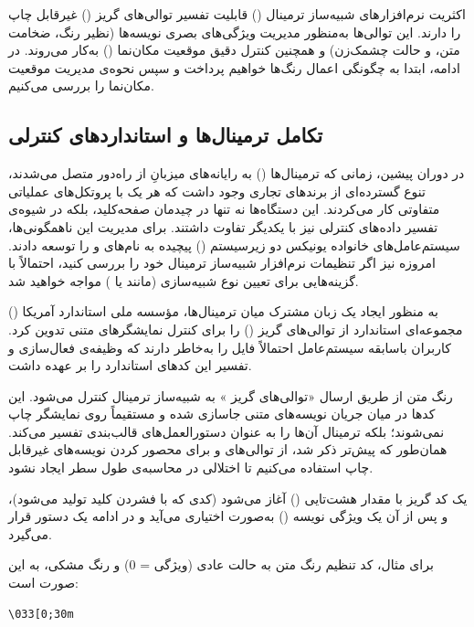 اکثریت نرم‌افزارهای شبیه‌ساز ترمینال () قابلیت تفسیر توالی‌های گریز () غیرقابل چاپ را دارند. این توالی‌ها به‌منظور مدیریت ویژگی‌های بصری نویسه‌ها (نظیر رنگ، ضخامت متن، و حالت چشمک‌زن) و همچنین کنترل دقیق موقعیت مکان‌نما () به‌کار می‌روند. در ادامه، ابتدا به چگونگی اعمال رنگ‌ها خواهیم پرداخت و سپس نحوه‌ی مدیریت موقعیت مکان‌نما را بررسی می‌کنیم.

\subsection{تکامل ترمینال‌ها و استانداردهای کنترلی}

در دوران پیشین، زمانی که ترمینال‌ها () به رایانه‌های میزبانِ از راه‌دور متصل می‌شدند، تنوع گسترده‌ای از برندهای تجاری وجود داشت که هر یک با پروتکل‌های عملیاتی متفاوتی کار می‌کردند. این دستگاه‌ها نه تنها در چیدمان صفحه‌کلید، بلکه در شیوه‌ی تفسیر داده‌های کنترلی نیز با یکدیگر تفاوت داشتند. برای مدیریت این ناهمگونی‌ها، سیستم‌عامل‌های خانواده یونیکس دو زیرسیستم () پیچیده به نام‌های  و  را توسعه دادند. امروزه نیز اگر تنظیمات نرم‌افزار شبیه‌ساز ترمینال خود را بررسی کنید، احتمالاً با گزینه‌هایی برای تعیین نوع شبیه‌سازی (مانند  یا ) مواجه خواهید شد.

به منظور ایجاد یک زبان مشترک میان ترمینال‌ها، مؤسسه ملی استاندارد آمریکا () مجموعه‌ای استاندارد از توالی‌های گریز () را برای کنترل نمایشگرهای متنی تدوین کرد. کاربران باسابقه سیستم‌عامل  احتمالاً فایل  را به‌خاطر دارند که وظیفه‌ی فعال‌سازی و تفسیر این کدهای استاندارد را بر عهده داشت.

رنگ متن از طریق ارسال «توالی‌های گریز » به شبیه‌ساز ترمینال کنترل می‌شود. این کدها در میان جریان نویسه‌های متنی جاسازی شده و مستقیماً روی نمایشگر چاپ نمی‌شوند؛ بلکه ترمینال آن‌ها را به عنوان دستورالعمل‌های قالب‌بندی تفسیر می‌کند. همان‌طور که پیش‌تر ذکر شد، از توالی‌های \cmd{\textbackslash [} و \cmd{\textbackslash ]} برای محصور کردن نویسه‌های غیرقابل چاپ استفاده می‌کنیم تا اختلالی در محاسبه‌ی طول سطر ایجاد نشود.

یک کد گریز  با مقدار هشت‌تایی ()  آغاز می‌شود (کدی که با فشردن کلید  تولید می‌شود)، و پس از آن یک ویژگی نویسه () به‌صورت اختیاری می‌آید و در ادامه یک دستور قرار می‌گیرد.

برای مثال، کد تنظیم رنگ متن به حالت عادی (ویژگی = 0) و رنگ مشکی، به این صورت است:

\begin{latin}
\begin{lstlisting}
\033[0;30m
\end{lstlisting}
\end{latin}


